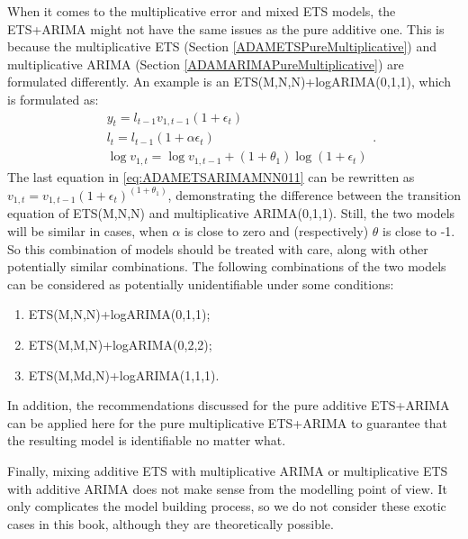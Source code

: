 \documentclass[
]{book}
\providecommand{\tightlist}{%
  \setlength{\itemsep}{0pt}\setlength{\parskip}{0pt}}
\theoremstyle{definition}
\theoremstyle{definition}
\theoremstyle{definition}
\theoremstyle{definition}
\theoremstyle{remark}
\begin{document}
When it comes to the multiplicative error and mixed ETS models, the ETS+ARIMA might not have the same issues as the pure additive one. This is because the multiplicative ETS (Section \ref{ADAMETSPureMultiplicative}) and multiplicative ARIMA (Section \ref{ADAMARIMAPureMultiplicative}) are formulated differently. An example is an ETS(M,N,N)+logARIMA(0,1,1), which is formulated as:
\begin{equation}
  \begin{aligned}
    &{y}_{t} = l_{t-1} v_{1,t-1} (1 + \epsilon_t) \\
    &l_t = l_{t-1}(1 + \alpha \epsilon_t) \\
    &\log v_{1,t} = \log v_{1,t-1} + (1+\theta_1) \log (1 + \epsilon_t)
  \end{aligned}.
  \label{eq:ADAMETSARIMAMNN011}
\end{equation}
The last equation in \eqref{eq:ADAMETSARIMAMNN011} can be rewritten as \(v_{1,t} = v_{1,t-1} (1 + \epsilon_t)^{(1+\theta_1)}\), demonstrating the difference between the transition equation of ETS(M,N,N) and multiplicative ARIMA(0,1,1). Still, the two models will be similar in cases, when \(\alpha\) is close to zero and (respectively) \(\theta\) is close to -1. So this combination of models should be treated with care, along with other potentially similar combinations. The following combinations of the two models can be considered as potentially unidentifiable under some conditions:

\begin{enumerate}
\def\labelenumi{\arabic{enumi}.}
\tightlist
\item
  ETS(M,N,N)+logARIMA(0,1,1);
\item
  ETS(M,M,N)+logARIMA(0,2,2);
\item
  ETS(M,Md,N)+logARIMA(1,1,1).
\end{enumerate}

In addition, the recommendations discussed for the pure additive ETS+ARIMA can be applied here for the pure multiplicative ETS+ARIMA to guarantee that the resulting model is identifiable no matter what.

Finally, mixing additive ETS with multiplicative ARIMA or multiplicative ETS with additive ARIMA does not make sense from the modelling point of view. It only complicates the model building process, so we do not consider these exotic cases in this book, although they are theoretically possible.
\end{document}
